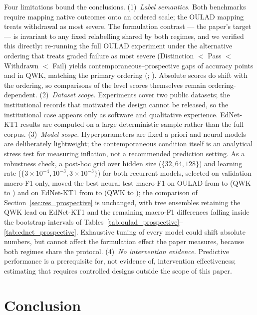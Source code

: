 \documentclass[sn-mathphys,Numbered]{sn-jnl}
\begin{document}
Four limitations bound the conclusions. (1)~\emph{Label semantics.} Both benchmarks require mapping native outcomes onto an ordered scale; the OULAD mapping treats withdrawal as most severe. The formulation contrast --- the paper's target --- is invariant to any fixed relabelling shared by both regimes, and we verified this directly: re-running the full OULAD experiment under the alternative ordering that treats graded failure as most severe (Distinction $<$ Pass $<$ Withdrawn $<$ Fail) yields contemporaneous--prospective gaps of \ordAccRange{} accuracy points and \ordQwkRange{} in QWK, matching the primary ordering (\gapOULADaccRange{}; \gapOULADqwkRange{}). Absolute scores do shift with the ordering, so comparisons of the level scores themselves remain ordering-dependent. (2)~\emph{Dataset scope.} Experiments cover two public datasets; the institutional records that motivated the design cannot be released, so the institutional case appears only as software and qualitative experience. EdNet-KT1 results are computed on a large deterministic sample rather than the full corpus. (3)~\emph{Model scope.} Hyperparameters are fixed a priori and neural models are deliberately lightweight; the contemporaneous condition itself is an analytical stress test for measuring inflation, not a recommended prediction setting. As a robustness check, a post-hoc grid over hidden size ($\{32,64,128\}$) and learning rate ($\{3\times10^{-4},10^{-3},3\times10^{-3}\}$) for both recurrent models, selected on validation macro-F1 only, moved the best neural test macro-F1 on OULAD from \aprioriOULADFone{} to \tunedOULADFone{} (QWK \aprioriOULADqwk{} to \tunedOULADqwk{}) and on EdNet-KT1 from \aprioriEdNetFone{} to \tunedEdNetFone{} (QWK \aprioriEdNetqwk{} to \tunedEdNetqwk{}); the comparison of Section~\ref{sec:res_prospective} is unchanged, with tree ensembles retaining the QWK lead on EdNet-KT1 and the remaining macro-F1 differences falling inside the bootstrap intervals of Tables~\ref{tab:oulad_prospective}--\ref{tab:ednet_prospective}. Exhaustive tuning of every model could shift absolute numbers, but cannot affect the formulation effect the paper measures, because both regimes share the protocol. (4)~\emph{No intervention evidence.} Predictive performance is a prerequisite for, not evidence of, intervention effectiveness; estimating that requires controlled designs outside the scope of this paper.

\section{Conclusion}\label{sec:conclusion}
\end{document}
